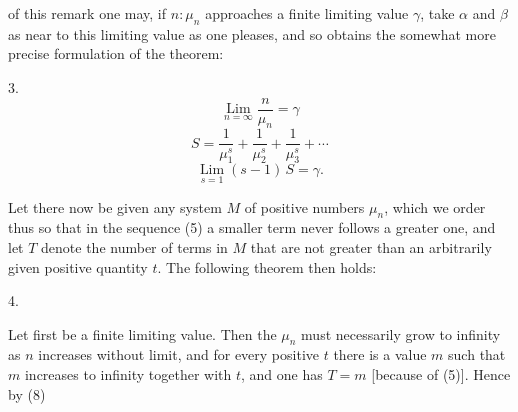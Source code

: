 of this remark one may, if $n : \mu_n$ approaches a finite limiting value $\gamma$, take $\alpha$ and $\beta$ as near to this limiting value as one pleases, and so obtains the somewhat more precise formulation of the theorem:

3. 
\[
\mathop{\mathrm{Lim}}\limits_{n=\infty} \frac{n}{\mu_n} = \gamma
\]
\[
S = \frac{1}{\mu_1^s} + \frac{1}{\mu_2^s} + \frac{1}{\mu_3^s} + \cdots
\]
\[
\mathop{\mathrm{Lim}}\limits_{s=1} (s-1)\,S = \gamma.
\]

Let there now be given any system $M$ of  positive numbers $\mu_n$, which we order thus
so that in the sequence (5) a smaller term never follows a greater one, and let $T$ denote the number of terms in $M$ that are not greater than an arbitrarily given positive quantity $t$. The following theorem then holds:

4. 

Let first
be a finite limiting value. Then the $\mu_n$ must necessarily grow to infinity as $n$ increases without limit, and for every positive $t$ there is a value $m$ such that
$m$ increases to infinity together with $t$, and one has $T = m$ [because of (5)]. Hence by (8)
